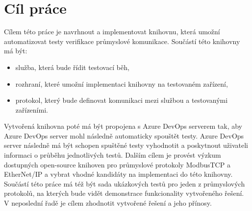 \chapter{Cíl práce}\label{chap:cil}
Cílem této práce je navrhnout a implementovat knihovnu, která umožní automatizovat testy verifikace průmyslové komunikace. 
Součástí této knihovny má být:
\begin{itemize}
    \item služba, která bude řídit testovací běh,
    \item rozhraní, které umožní implementaci knihovny na testovaném zařízení,
    \item protokol, který bude definovat komunikaci mezi službou a testovanými zařízeními.
\end{itemize}
Vytvořená knihovna poté má být propojena s Azure DevOps serverem tak, aby Azure DevOps server mohl následně automaticky spouštět testy. Azure DevOps server následně má být schopen spuštěné testy vyhodnotit a poskytnout uživateli informaci o průběhu jednotlivých testů. 
Dalším cílem je provést výzkum dostupných open-source knihoven pro průmyslové protokoly ModbusTCP a EtherNet/IP a vybrat vhodné kandidáty na implementaci do této knihovny. 
Součástí této práce má též být sada ukázkových testů pro jeden z průmyslových protokolů, na kterých bude 
vidět demonstrace funkcionality vytvořeného řešení. V neposlední řadě je cílem zhodnotit vytvořené řešení a jeho přínosy.